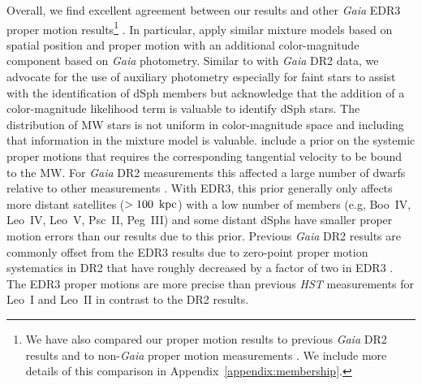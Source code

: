 \documentclass[twocolumn]{aastex63}
\begin{document}
Overall, we find excellent agreement between our results and other {\it Gaia} EDR3 proper motion results\footnote{We have also compared our proper motion results to previous {\it Gaia} DR2 results \citep{Torrealba2019MNRAS.488.2743T, Chakrabarti2019ApJ...886...67C, McConnachie2020AJ....160..124M, Kallivayalil2018ApJ...867...19K, Fritz2018A&A...619A.103F, GaiaHelmi2018A&A...616A..12G, Simon2018ApJ...863...89S, Carlin2018ApJ...865....7C, Massari2018A&A...620A.155M, Mau2020ApJ...890..136M, Pace2019ApJ...875...77P, Fritz2019A&A...623A.129F, Fu2019ApJ...883...11F, Walker2019MNRAS.490.4121W, Longeard2018MNRAS.480.2609L, Simon2021ApJ...908...18S, Simon2020ApJ...892..137S, Gregory2020MNRAS.496.1092G, MutluPakdil2019ApJ...885...53M, Longeard2020MNRAS.491..356L, Massari2018NatAs...2..156M, Chiti2021NatAs...5..392C, Pace2020MNRAS.495.3022P} and to non-{\it Gaia} proper motion measurements \citep{Piatek2003AJ....126.2346P, Walker2008ApJ...688L..75W, Pryor2015AJ....149...42P, CasettiDinescu2016MNRAS.461..271C, Sohn2017ApJ...849...93S, Piatek2002AJ....124.3198P, Dinescu2004AJ....128..687D, Piatek2007AJ....133..818P, Mendez2011AJ....142...93M, Sohn2013ApJ...768..139S, Lepine2011ApJ...741..100L, Piatek2016AJ....152..166P, Piatek2006AJ....131.1445P, Fritz2018ApJ...860..164F, CasettiDinescu2018MNRAS.473.4064C, Piatek2005AJ....130...95P}. We include more details of this comparison in Appendix~\ref{appendix:membership}.} \citep{McConnachie2020RNAAS...4..229M, Li2021ApJ...916....8L, MartinezGarcia2021MNRAS.505.5884M, Vitral2021MNRAS.504.1355V, Battaglia2022A&A...657A..54B, Qi2022MNRAS.512.5601Q}. 
In particular,  \citet{McConnachie2020RNAAS...4..229M, Battaglia2022A&A...657A..54B} apply similar mixture models based on spatial position and proper motion with an additional  color-magnitude component based on {\it Gaia} photometry. Similar to \citet{Pace2019ApJ...875...77P} with {\it Gaia} DR2 data, we advocate for the use of auxiliary photometry especially for faint stars to assist with the identification of dSph members but acknowledge that the addition of a color-magnitude likelihood term is valuable to identify dSph stars. The distribution of MW stars is not uniform in color-magnitude space and including that information in the mixture model is valuable. 
\citet{McConnachie2020RNAAS...4..229M} include a prior on the systemic proper motions that requires the corresponding tangential velocity  to be bound to the MW. 
For {\it Gaia} DR2 measurements this affected a large number of dwarfs relative to other measurements \citep{McConnachie2020AJ....160..124M}.   
With EDR3, this prior generally only affects more distant satellites ($>100~\mathrm{\,kpc}$) with a low number of members (e.g, Boo~IV, Leo~IV, Leo~V, Psc~II, Peg~III) and  some distant dSphs have smaller proper motion errors than our results due to this prior.  
Previous {\it Gaia} DR2 results are commonly offset from the EDR3 results due to zero-point proper motion systematics in DR2 that have roughly  decreased by a factor of two in EDR3 \citep{GaiaCollaboration_Luri2021A&A...649A...7G}. The EDR3 proper motions are more precise than previous {\it HST} measurements for Leo~I and Leo~II in contrast to the DR2 results. 
\end{document}
